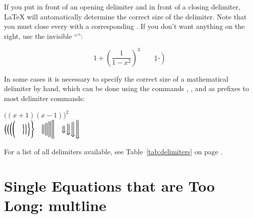 If you put  in front of an opening delimiter and
 in front of a closing delimiter, \LaTeX{} will automatically
determine the correct size of the delimiter. Note that you must close
every  with a corresponding . If you
don't want anything on the right, use the invisible ``'':
\begin{example}
\begin{equation*}
1 + \left(\frac{1}{1-x^{2}}
    \right)^3 \qquad 
\left. \ddagger \frac{~}{~}\right)
\end{equation*}
\end{example}

In some cases it is necessary to specify the correct size of a
mathematical delimiter by hand,
which can be done using the commands , ,  and
 as prefixes to most delimiter commands:
\begin{example}
$\Big((x+1)(x-1)\Big)^{2}$\\
$\big( \Big( \bigg( \Bigg( \quad
\big\} \Big\} \bigg\} \Bigg\} \quad
\big\| \Big\| \bigg\| \Bigg\| \quad
\big\Downarrow \Big\Downarrow 
\bigg\Downarrow \Bigg\Downarrow$
\end{example}
 For a list of all delimiters available, see Table~\ref{tab:delimiters} on page
\pageref{tab:delimiters}. 


\section{Single Equations that are Too Long: multline}
\label{sec:multline}

